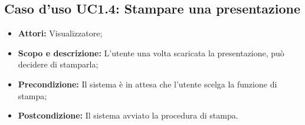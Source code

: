 \subsection{Caso d'uso UC1.4: Stampare una presentazione}
\begin{itemize}
	\item \textbf{Attori:} Visualizzatore;
	\item \textbf{Scopo e descrizione:} L'utente una volta scaricata la presentazione, può decidere di stamparla;
	\item \textbf{Precondizione:} Il sistema è in attesa che l'utente scelga la funzione di stampa;
	\item \textbf{Postcondizione:} Il sistema avviato la procedura di stampa.
\end{itemize}

\newpage
